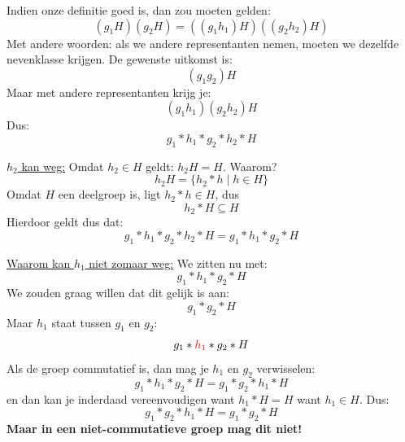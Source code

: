 Indien onze definitie goed is, dan zou moeten gelden:
\begin{equation*}
    (g_1H)(g_2H) = ((g_1h_1)H)((g_2h_2)H)
\end{equation*}
Met andere woorden: als we andere representanten nemen, moeten we dezelfde nevenklasse krijgen. De gewenste uitkomst is:
\begin{equation*}
    (g_1g_2)H
\end{equation*}
Maar met andere representanten krijg je:
\begin{equation*}
    (g_1h_1)(g_2h_2)H
\end{equation*}
Dus:
\begin{equation*}
    g_1*h_1*g_2*h_2*H
\end{equation*}

\underline{$h_2$ kan weg:} Omdat $h_2 \in H$ geldt: $h_2H = H$. Waarom?
\begin{equation*}
    h_2H = \{h_2*h \mid h \in H\}
\end{equation*}
Omdat $H$ een deelgroep is, ligt $h_2*h \in H$, dus 
\begin{equation*}
    h_2 * H \subseteq H
\end{equation*}
Hierdoor geldt dus dat:
\begin{equation*}
    g_1*h_1*g_2*h_2*H = g_1 * h_1 * g_2 * H
\end{equation*}

\underline{Waarom kan $h_1$ niet zomaar weg:} We zitten nu met:
\begin{equation*}
    g_1 * h_1 * g_2 * H
\end{equation*}
We zouden graag willen dat dit gelijk is aan:
\begin{equation*}
    g_1 * g_2 * H
\end{equation*}
Maar $h_1$ staat tussen $g_1$ en $g_2$:
\begin{equation*}
    g_1 * \textcolor{red}{h_1} * g_2 * H 
\end{equation*}
Als de groep commutatief is, dan mag je $h_1$ en $g_2$ verwisselen:
\begin{equation*}
    g_1 * h_1 * g_2 * H = g_1 * g_2 * h_1 * H
\end{equation*}
en dan kan je inderdaad vereenvoudigen want $h_1 * H = H$ want $h_1 \in H$. Dus:
\begin{equation*}
    g_1 * g_2 * h_1 * H = g_1 * g_2 * H
\end{equation*}
\textbf{Maar in een niet-commutatieve groep mag dit niet!}

